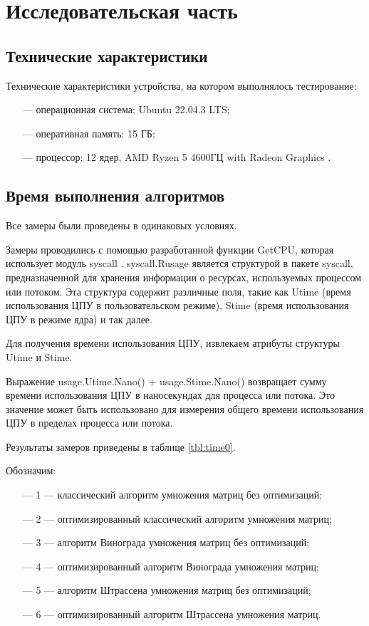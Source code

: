 \chapter{Исследовательская часть}

\section{Технические характеристики}

Технические характеристики устройства, на котором выполнялось тестирование:

\begin{itemize}
	\item[---] операционная система: Ubuntu \cite{ubuntu} 22.04.3 LTS;
	\item[---] оперативная память: 15 ГБ;
	\item[---] процессор: 12 ядер, AMD Ryzen 5 4600ГЦ with Radeon Graphics \cite{amd}.
\end{itemize}


\section{Время выполнения алгоритмов}
Все замеры были проведены в одинаковых условиях.

Замеры проводились с помощью разработанной функции GetCPU, которая использует модуль syscall \cite{syscall}. syscall.Rusage является структурой в пакете syscall, предназначенной для хранения информации о ресурсах, используемых процессом или потоком. Эта структура содержит различные поля, такие как Utime (время использования ЦПУ в пользовательском режиме), Stime (время использования ЦПУ в режиме ядра) и так далее.

Для получения времени использования ЦПУ, извлекаем атрибуты структуры Utime и Stime.

Выражение usage.Utime.Nano() + usage.Stime.Nano() возвращает сумму времени использования ЦПУ в наносекундах для процесса или потока. Это значение может быть использовано для измерения общего времени использования ЦПУ в пределах процесса или потока.

Результаты замеров приведены в таблице \ref{tbl:time0}.

Обозначим: 
\begin{itemize}
	\item[---] 1 --- классический алгоритм умножения матриц без оптимизаций;
	\item[---] 2 --- оптимизированный классический алгоритм умножения матриц;
	\item[---] 3 --- алгоритм Винограда умножения матриц без оптимизаций;
	\item[---] 4 --- оптимизированный алгоритм Винограда умножения матриц;
	\item[---] 5 --- алгоритм Штрассена умножения матриц без оптимизаций;
	\item[---] 6 --- оптимизированный алгоритм Штрассена умножения матриц.
\end{itemize}


